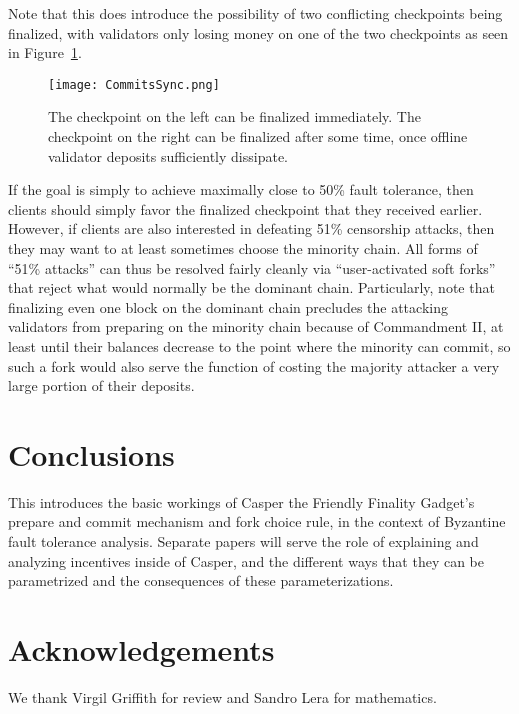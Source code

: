 \documentclass[12pt, final]{article}
\newcommand{\figref}[1]{Figure~\ref{#1}}
\begin{document}
Note that this does introduce the possibility of two conflicting checkpoints being finalized, with validators only losing money on one of the two checkpoints as seen in \figref{fig:commitsync}.

\begin{figure}[h!tb]
\centering
\texttt{[image: CommitsSync.png]}
\caption{The checkpoint on the left can be finalized immediately. The checkpoint on the right can be finalized after some time, once offline validator deposits sufficiently dissipate.}
\label{fig:commitsync}
\end{figure}

If the goal is simply to achieve maximally close to 50\% fault tolerance, then clients should simply favor the finalized checkpoint that they received earlier. However, if clients are also interested in defeating 51\% censorship attacks, then they may want to at least sometimes choose the minority chain. All forms of ``51\% attacks'' can thus be resolved fairly cleanly via ``user-activated soft forks'' that reject what would normally be the dominant chain. Particularly, note that finalizing even one block on the dominant chain precludes the attacking validators from preparing on the minority chain because of Commandment II, at least until their balances decrease to the point where the minority can commit, so such a fork would also serve the function of costing the majority attacker a very large portion of their deposits.

\section{Conclusions}

This introduces the basic workings of Casper the Friendly Finality Gadget's prepare and commit mechanism and fork choice rule, in the context of Byzantine fault tolerance analysis. Separate papers will serve the role of explaining and analyzing incentives inside of Casper, and the different ways that they can be parametrized and the consequences of these parameterizations.

\section{Acknowledgements}

We thank Virgil Griffith for review and Sandro Lera for mathematics.





%

\end{document}
